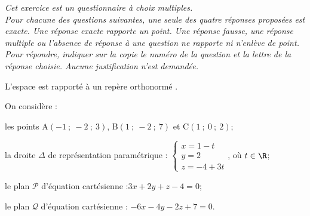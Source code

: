 \medskip

\emph{Cet exercice est un questionnaire à choix multiples.\\
Pour chacune des questions suivantes, une seule des quatre réponses proposées est exacte. Une réponse exacte rapporte un point. Une réponse fausse, une réponse multiple ou l'absence de réponse à une question ne rapporte ni n'enlève de point. Pour répondre, indiquer sur la copie le numéro de la question et la lettre de la réponse choisie. Aucune justification n'est demandée.}

\bigskip

L'espace est rapporté à un repère orthonormé \Oijk.

\medskip
On considère :

les points A$(-1~;~-2~;~3)$, B$(1~;~-2~;~7)$ et C$(1~;~0~;~2)$;

la droite $\Delta$ de représentation paramétrique : \quad $\left\{\begin{array}{l}x=1-t \\ y=2 \\ z=-4+3 t\end{array}\right.$, où $t \in \R$;

le plan $\mathcal{P}$ d'équation cartésienne :\quad $3 x+2 y+z-4=0$;

le plan $\mathcal{Q}$ d'équation cartésienne : \quad $-6 x-4 y-2 z+7=0$.

